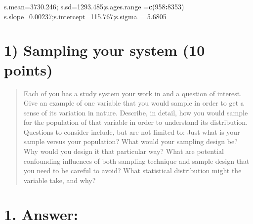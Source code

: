 \documentclass[]{article}
\newenvironment{Shaded}{\begin{snugshade}}{\end{snugshade}}
\newcommand{\KeywordTok}[1]{\textcolor[rgb]{0.13,0.29,0.53}{\textbf{#1}}}
\newcommand{\DecValTok}[1]{\textcolor[rgb]{0.00,0.00,0.81}{#1}}
\newcommand{\FloatTok}[1]{\textcolor[rgb]{0.00,0.00,0.81}{#1}}
\newcommand{\StringTok}[1]{\textcolor[rgb]{0.31,0.60,0.02}{#1}}
\newcommand{\OperatorTok}[1]{\textcolor[rgb]{0.81,0.36,0.00}{\textbf{#1}}}
\newcommand{\NormalTok}[1]{#1}
\begin{document}
\begin{Shaded}
\begin{Highlighting}[]
\NormalTok{s.mean=}\FloatTok{3730.246}\NormalTok{; s.sd=}\FloatTok{1293.485}\NormalTok{;s.ages.range =}\KeywordTok{c}\NormalTok{(}\DecValTok{958}\OperatorTok{:}\DecValTok{8353}\NormalTok{)}
\NormalTok{s.slope=}\FloatTok{0.00237}\NormalTok{;s.intercept=}\FloatTok{115.767}\NormalTok{;s.sigma =}\StringTok{ }\FloatTok{5.6805}
\end{Highlighting}
\end{Shaded}

\section{1) Sampling your system (10
points)}\label{sampling-your-system-10-points}

\begin{quote}
Each of you has a study system your work in and a question of interest.
Give an example of one variable that you would sample in order to get a
sense of its variation in nature. Describe, in detail, how you would
sample for the population of that variable in order to understand its
distribution. Questions to consider include, but are not limited to:
Just what is your sample versus your population? What would your
sampling design be? Why would you design it that particular way? What
are potential confounding influences of both sampling technique and
sample design that you need to be careful to avoid? What statistical
distribution might the variable take, and why?
\end{quote}

\section{1. Answer:}\label{answer}
\end{document}
